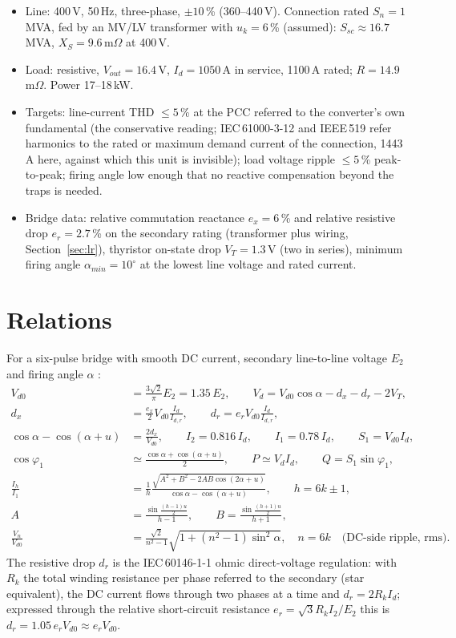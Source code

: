 \documentclass[11pt,a4paper]{article}
\newcommand{\Vdo}{V_{d0}}
\newcommand{\Id}{I_d}
\newcommand{\ex}{e_x}
\newcommand{\dx}{d_x}
\newcommand{\Ell}{E_{2}}
\begin{document}
\begin{itemize}
\item Line: 400\,V, 50\,Hz, three-phase, $\pm10$\,\% (360--440\,V). Connection rated $S_n = 1$\,MVA, fed by an MV/LV transformer with $u_k = 6$\,\% (assumed): $S_{sc} \approx 16.7$\,MVA, $X_S = 9.6$\,m$\Omega$ at 400\,V.
\item Load: resistive, $V_{out} = 16.4$\,V, $I_d = 1050$\,A in service, 1100\,A rated; $R = 14.9$\,m$\Omega$. Power 17--18\,kW.
\item Targets: line-current THD $\le 5$\,\% at the PCC referred to the converter's own fundamental (the conservative reading; IEC\,61000-3-12 and IEEE\,519 refer harmonics to the rated or maximum demand current of the connection, 1443\,A here, against which this unit is invisible); load voltage ripple $\le 5$\,\% peak-to-peak; firing angle low enough that no reactive compensation beyond the traps is needed.
\item Bridge data: relative commutation reactance $\ex = 6$\,\% and relative resistive drop $e_r = 2.7$\,\% on the secondary rating (transformer plus wiring, Section~\ref{sec:lr}), thyristor on-state drop $V_T = 1.3$\,V (two in series), minimum firing angle $\alpha_{min} = 10^\circ$ at the lowest line voltage and rated current.
\end{itemize}

\section{Relations}

For a six-pulse bridge with smooth DC current, secondary line-to-line voltage $\Ell$ and firing angle $\alpha$ \cite{iec60146,kimbark}:
\begin{align}
\Vdo &= \frac{3\sqrt2}{\pi}\Ell = 1.35\,\Ell, \qquad
V_d = \Vdo\cos\alpha - \dx - d_r - 2V_T, \label{eq:vd}\\
\dx &= \frac{\ex}{2}\Vdo\frac{\Id}{\Id{}_{,r}}, \qquad d_r = e_r\Vdo\frac{\Id}{\Id{}_{,r}}, \nonumber\\
\cos\alpha - \cos(\alpha+u) &= \frac{2\dx}{\Vdo}, \qquad
I_2 = 0.816\,\Id, \qquad I_1 = 0.78\,\Id, \qquad S_1 = \Vdo\Id, \label{eq:s1}\\
\cos\varphi_1 &\simeq \frac{\cos\alpha + \cos(\alpha+u)}{2}, \qquad P \simeq V_d\Id, \qquad Q = S_1\sin\varphi_1, \label{eq:pq}\\
\frac{I_h}{I_1} &= \frac{1}{h}\frac{\sqrt{A^2+B^2-2AB\cos(2\alpha+u)}}{\cos\alpha-\cos(\alpha+u)},\qquad h = 6k\pm1, \label{eq:harm}\\
A &= \frac{\sin\frac{(h-1)u}{2}}{h-1},\qquad B = \frac{\sin\frac{(h+1)u}{2}}{h+1}, \nonumber\\
\frac{V_n}{\Vdo} &= \frac{\sqrt2}{n^2-1}\sqrt{1+(n^2-1)\sin^2\alpha}, \quad n = 6k \quad\text{(DC-side ripple, rms)}. \label{eq:vripple}
\end{align}
The resistive drop $d_r$ is the IEC\,60146-1-1 ohmic direct-voltage regulation: with $R_k$ the total winding resistance per phase referred to the secondary (star equivalent), the DC current flows through two phases at a time and $d_r = 2R_k\Id$; expressed through the relative short-circuit resistance $e_r = \sqrt3 R_k I_2/\Ell$ this is $d_r = 1.05\,e_r\Vdo \approx e_r\Vdo$.
\end{document}
